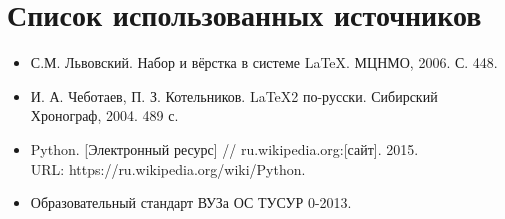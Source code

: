 \section*{Список использованных источников}


\begin{itemize}

\item С.М. Львовский. Набор и вёрстка в системе \LaTeX. МЦНМО, 2006. С. 448.
\item И. А. Чеботаев, П. З. Котельников. \LaTeX 2 по-русски. Сибирский Хронограф, 2004. 489 с.
\item Python. [Электронный ресурс] // ru.wikipedia.org:[сайт]. 2015.\\ URL: https://ru.wikipedia.org/wiki/Python.
\item Образовательный стандарт ВУЗа ОС ТУСУР 0-2013.
\end{itemize}
